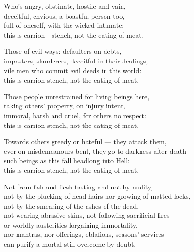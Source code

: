 \begin{MyDescription}{}
Who's angry, obstinate, hostile and vain,\\
deceitful, envious, a boastful person too,\\
full of oneself, with the wicked intimate:\\
this is carrion—stench, not the eating of meat.
\end{MyDescription}    

\begin{MyDescription}{}
Those of evil ways: defaulters on debts,\\
imposters, slanderers, deceitful in their dealings,\\
vile men who commit evil deeds in this world:\\
this is carrion-stench, not the eating of meat.
\end{MyDescription}   
      
\begin{MyDescription}{}
Those people unrestrained for living beings here,\\
taking others' property, on injury intent,\\
immoral, harsh and cruel, for others no respect:\\
this is carrion-stench, not the eating of meat.
\end{MyDescription} 

\begin{MyDescription}{}
Towards others greedy or hateful — they attack them,\\
ever on misdemeanours bent, they go to darkness after death\\
such beings as this fall headlong into Hell:\\
this is carrion-stench, not the eating of meat.
\end{MyDescription} 
    
\begin{MyDescription}{}
Not from ﬁsh and flesh tasting and not by nudity,\\
not by the plucking of head-hairs nor growing of matted locks,\\
not by the smearing of the ashes of the dead,\\
not wearing abrasive skins, not following sacriﬁcial ﬁres\\
or worldly austerities forgaining immortality,\\
nor mantras, nor offerings, oblaﬁons, seasons' services\\
can purify a mortal still overcome by doubt.
\end{MyDescription} 

